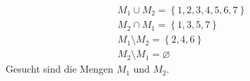 \begin{eqnarray}
	M_1 \cup M_2 = \left\{ 1,2,3,4,5,6,7 \right\}\\
	M_2 \cap M_1 = \left\{ 1,3,5,7       \right\}\\
	M_1 \setminus M_2 = \left\{ 2,4,6 \right\} \\
	M_2 \setminus M_1 = \varnothing
\end{eqnarray}
Gesucht sind die Mengen $M_1$ und $M_2$.\\ \vspace{2cm}

